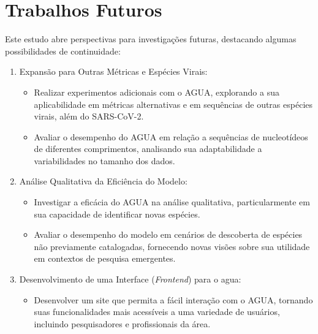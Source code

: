 \chapter{Trabalhos Futuros}

Este estudo abre perspectivas para investigações futuras, destacando algumas possibilidades de continuidade:

\begin{enumerate}
  \item Expansão para Outras Métricas e Espécies Virais:
        \begin{itemize}
          \item Realizar experimentos adicionais com o AGUA, explorando a sua aplicabilidade em métricas alternativas e em sequências de outras espécies virais, além do SARS-CoV-2.
          \item Avaliar o desempenho do AGUA em relação a sequências de nucleotídeos de diferentes comprimentos, analisando sua adaptabilidade a variabilidades no tamanho dos dados.
        \end{itemize}
  \item Análise Qualitativa da Eficiência do Modelo:
        \begin{itemize}
          \item Investigar a eficácia do AGUA na análise qualitativa, particularmente em sua capacidade de identificar novas espécies.
          \item Avaliar o desempenho do modelo em cenários de descoberta de espécies não previamente catalogadas, fornecendo novas visões sobre sua utilidade em contextos de pesquisa emergentes.
        \end{itemize}
  \item Desenvolvimento de uma Interface (\textit{Frontend}) para o \gls{agua}:
        \begin{itemize}
          \item Desenvolver um site que permita a fácil interação com o AGUA, tornando suas funcionalidades mais acessíveis a uma variedade de usuários, incluindo pesquisadores e profissionais da área.
        \end{itemize}
\end{enumerate}

